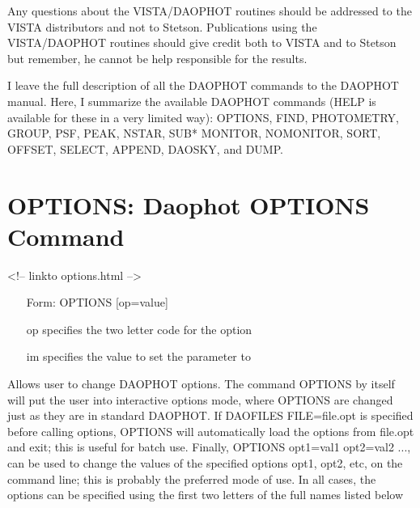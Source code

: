 Any questions about the VISTA/DAOPHOT routines should be addressed to the
VISTA distributors and not to Stetson. Publications using the VISTA/DAOPHOT
routines should give credit both to VISTA and to Stetson but remember, he
cannot be help responsible for the results.

I leave the full description of all the DAOPHOT commands to the DAOPHOT
manual. Here, I summarize the available DAOPHOT commands (HELP is available
for these in a very limited way): OPTIONS, FIND, PHOTOMETRY, GROUP, PSF,
PEAK, NSTAR, SUB* MONITOR, NOMONITOR, SORT, OFFSET, SELECT, APPEND, DAOSKY,
and DUMP.


\section{OPTIONS: Daophot OPTIONS Command}
\begin{rawhtml}
<!-- linkto options.html -->
\end{rawhtml}
\begin{itemize}
  \item[Form: OPTIONS {[op=value]} \hfill]{}
  \item[op]{specifies the two letter code for the option}
  \item[im]{specifies the value to set the parameter to}
\end{itemize}

Allows user to change DAOPHOT options. 
The command OPTIONS by itself will put the
user into interactive options mode, where OPTIONS are changed just as they
are in standard DAOPHOT. If DAOFILES FILE=file.opt is specified before
calling options, OPTIONS will automatically load the options from file.opt
and exit; this is useful for batch use. Finally, OPTIONS opt1=val1
opt2=val2 ..., can be used to change the values of the specified options
opt1, opt2, etc, on the command line; this is probably the preferred mode
of use. In all cases, the options can be specified using the first
two letters of the full names listed below

